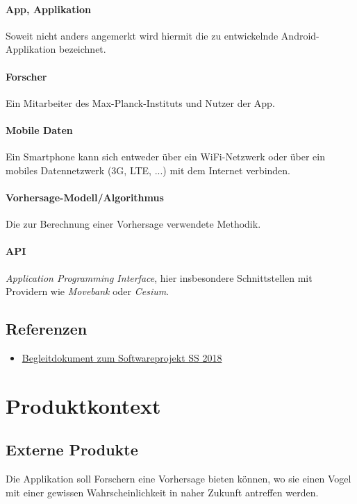\documentclass[12pt]{article} %
\begin{document}
\paragraph{App, Applikation} Soweit nicht anders angemerkt wird hiermit die zu entwickelnde Android-Applikation bezeichnet.
 \paragraph{Forscher} Ein Mitarbeiter des Max-Planck-Instituts und Nutzer der App.
 \paragraph{Mobile Daten} Ein Smartphone kann sich entweder über ein WiFi-Netzwerk oder über ein mobiles Datennetzwerk (3G, LTE, ...) mit dem Internet verbinden. 
\paragraph{Vorhersage-Modell/Algorithmus} Die zur Berechnung einer Vorhersage verwendete Methodik. 
\paragraph{API} \textit{Application Programming Interface}, hier insbesondere Schnittstellen mit Providern wie \textit{Movebank} oder \textit{Cesium}. 

\subsection{Referenzen}

\begin{itemize} 
 	 \item  \href{https://docs.google.com/document/d/1Yc2f18JFaHyhrgM2h2WiATQ0zVmZnsc9W1ImhwWJF-g/edit?usp=sharing}{Begleitdokument zum Softwareprojekt SS 2018}
\end{itemize} 




\newpage
\section{Produktkontext} \label{kontext}

\subsection{Externe Produkte}
Die Applikation soll Forschern eine Vorhersage bieten können, wo sie einen Vogel mit einer gewissen Wahrscheinlichkeit in naher Zukunft antreffen werden. 
\end{document}

